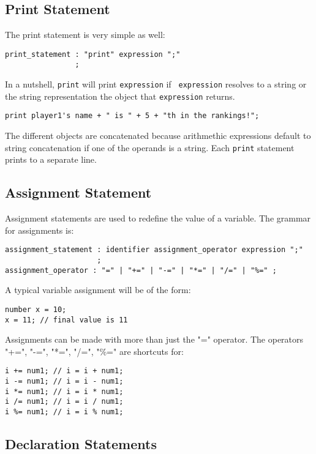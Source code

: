 \subsection{Print Statement}

The print statement is very simple as well: 

\begin{verbatim}
print_statement : "print" expression ";"
                ;
\end{verbatim}

In a nutshell, \texttt{print} will print {\tt expression} if {\tt
  expression} resolves to a string or the string representation the
object that \texttt{expression} returns.

\begin{verbatim}
print player1's name + " is " + 5 + "th in the rankings!";
\end{verbatim}

The different objects are concatenated because arithmethic expressions
default to string concatenation if one of the operands is a
string. Each {\tt print} statement prints to a separate line.

\subsection{Assignment Statement}
Assignment statements are used to redefine the value of a
variable. The grammar for assignments is:

\begin{verbatim}
assignment_statement : identifier assignment_operator expression ";"
                     ;
assignment_operator : "=" | "+=" | "-=" | "*=" | "/=" | "%=" ;
\end{verbatim}

A typical variable assignment will be of the form:

\begin{verbatim}
number x = 10;
x = 11; // final value is 11
\end{verbatim}

Assignments can be made with more than just the "=" operator. The
operators "+=", "-=", "*=", "/=", "\%=" are shortcuts for:

\begin{verbatim}
i += num1; // i = i + num1;
i -= num1; // i = i - num1;
i *= num1; // i = i * num1;
i /= num1; // i = i / num1;
i %= num1; // i = i % num1;
\end{verbatim}
 
\subsection{Declaration Statements}

